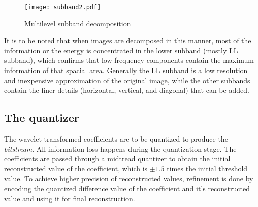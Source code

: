 \documentclass[./A14_Report.tex]{subfiles}
\begin{document}
\FloatBarrier
\begin{figure}[htpb]
    \centering
    \texttt{[image: subband2.pdf]}
    \caption{Multilevel subband decomposition}%
    \label{fig:subband2}
\end{figure}
\FloatBarrier

It is to be noted that when images are decomposed in this manner, most of the information
or the energy is concentrated in the lower subband (mostly LL subband), which confirms 
that low frequency components contain the maximum information of that spacial area.
Generally the LL subband is a low resolution and inexpensive approximation of the original
image, while the other subbands contain the finer details (horizontal, vertical, and diagonal)
that can be added.

\subsection{The quantizer}
\label{sec:the_quantizer}

The wavelet transformed coefficients are to be quantized to produce the \textit{bitstream}.
All information loss happens during the quantization stage.
The coefficients are passed through a midtread quantizer to obtain the initial 
reconstructed value of the coefficient, which is $\pm 1.5$ times the initial threshold value. 
To achieve higher precision of reconstructed values, refinement is done by encoding the
quantized difference value of the coefficient and it's reconstructed value and using it
for final reconstruction.
\end{document}
